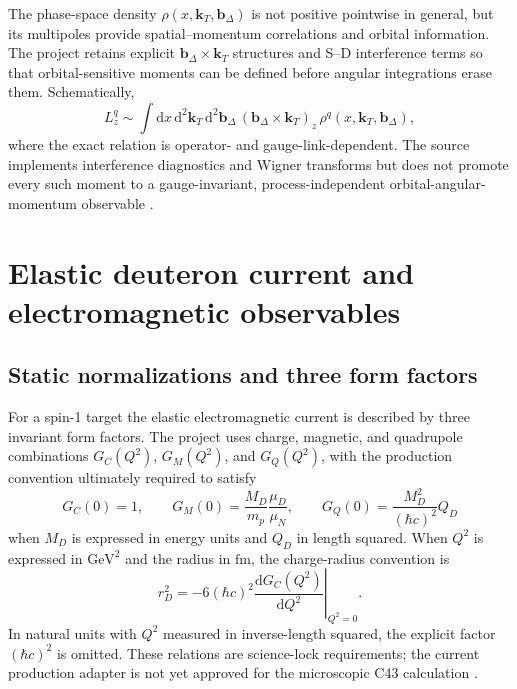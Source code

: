 \documentclass[11pt,oneside]{book}
\newcommand{\kT}{\bm{k}_{T}}
\newcommand{\bDelta}{\bm{b}_{\Delta}}
\newcommand{\dd}{\mathrm{d}}
\newcommand{\GeV}{\mathrm{GeV}}
\newcommand{\fm}{\mathrm{fm}}
\begin{document}
The phase-space density $\rho(x,\kT,\bDelta)$ is not positive pointwise in general, but its multipoles provide spatial--momentum correlations and orbital information.  The project retains explicit $\bDelta\times\kT$ structures and S--D interference terms so that orbital-sensitive moments can be defined before angular integrations erase them.  Schematically,
\begin{equation}
 L_z^q
 \sim\int\dd x\,\dd^2\kT\,\dd^2\bDelta\,
 (\bDelta\times\kT)_z\,
 \rho^q(x,\kT,\bDelta),
 \label{eq:oam-wigner}
\end{equation}
where the exact relation is operator- and gauge-link-dependent.  The source implements interference diagnostics and Wigner transforms but does not promote every such moment to a gauge-invariant, process-independent orbital-angular-momentum observable \cite{LorcePasquini2011,EchevarriaGTMD2016,DWGTMDTechnicalDraft2026}.

\chapter{Elastic deuteron current and electromagnetic observables}
\label{chap:elastic-current}

\section{Static normalizations and three form factors}

For a spin-1 target the elastic electromagnetic current is described by three invariant form factors.  The project uses charge, magnetic, and quadrupole combinations $G_C(Q^2)$, $G_M(Q^2)$, and $G_Q(Q^2)$, with the production convention ultimately required to satisfy
\begin{equation}
 G_C(0)=1,
 \qquad
 G_M(0)=\frac{M_D}{m_p}\frac{\mu_D}{\mu_N},
 \qquad
 G_Q(0)=\frac{M_D^2}{(\hbar c)^2}Q_D
 \label{eq:static-formfactor-normalizations}
\end{equation}
when $M_D$ is expressed in energy units and $Q_D$ in length squared.  When $Q^2$ is expressed in $\GeV^2$ and the radius in $\fm$, the charge-radius convention is
\begin{equation}
 r_D^2=-6(\hbar c)^2
 \left.\frac{\dd G_C(Q^2)}{\dd Q^2}\right|_{Q^2=0}.
 \label{eq:charge-radius-slope}
\end{equation}
In natural units with $Q^2$ measured in inverse-length squared, the explicit factor $(\hbar c)^2$ is omitted.
These relations are science-lock requirements; the current production adapter is not yet approved for the microscopic C43 calculation \cite{AbbottEtAl2000,PuchalskiKomasaPachucki2020,NISTCODATA2022,DWC400ScienceLock2026}.
\end{document}
